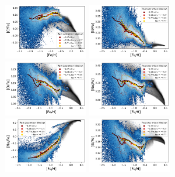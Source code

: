 \documentclass[fleqn,usenatbib]{mnras}
\begin{document}
\begin{figure}
    \centering
    \includegraphics[width=0.33\textwidth]{figures/xfe_feh_zones_C.png}
    \includegraphics[width=0.33\textwidth]{figures/xfe_feh_zones_N.png}
    \includegraphics[width=0.33\textwidth]{figures/xfe_feh_zones_O.png}
    \includegraphics[width=0.33\textwidth]{figures/xfe_feh_zones_Ne.png}
    \includegraphics[width=0.33\textwidth]{figures/xfe_feh_zones_Na.png}
    \includegraphics[width=0.33\textwidth]{figures/xfe_feh_zones_Si.png}

\end{figure}
\end{document}
